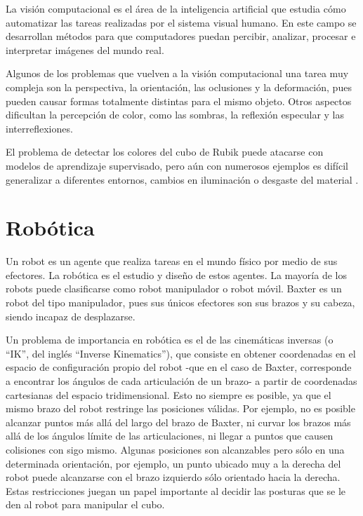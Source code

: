 La visión computacional es el área de la inteligencia artificial que estudia cómo automatizar las tareas realizadas por el sistema visual humano. En este campo se desarrollan métodos para que computadores puedan percibir, analizar, procesar e interpretar imágenes del mundo real\cite{vision}.

Algunos de los problemas que vuelven a la visión computacional una tarea muy compleja son la perspectiva, la orientación, las oclusiones y la deformación, pues pueden causar formas totalmente distintas para el mismo objeto. Otros aspectos dificultan la percepción de color, como las sombras, la reflexión especular y las interreflexiones\cite{aima}.

El problema de detectar los colores del cubo de Rubik puede atacarse con modelos de aprendizaje supervisado, pero aún con numerosos ejemplos es difícil generalizar a diferentes entornos, cambios en iluminación o desgaste del material \cite{rubikcolors}.

\section*{Robótica}
Un robot es un agente que realiza tareas en el mundo físico por medio de sus efectores\cite{aima}. La robótica es el estudio y diseño de estos agentes. La mayoría de los robots puede clasificarse como robot manipulador o robot móvil. Baxter es un robot del tipo manipulador, pues sus únicos efectores son sus brazos y su cabeza, siendo incapaz de desplazarse.

Un problema de importancia en robótica es el de las cinemáticas inversas\cite{ik} (o ``IK'', del inglés ``Inverse Kinematics''), que consiste en obtener coordenadas en el espacio de configuración propio del robot -que en el caso de Baxter, corresponde a encontrar los ángulos de cada articulación de un brazo- a partir de coordenadas cartesianas del espacio tridimensional. Esto no siempre es posible, ya que el mismo brazo del robot restringe las posiciones válidas. Por ejemplo, no es posible alcanzar puntos más allá del largo del brazo de Baxter, ni curvar los brazos más allá de los ángulos límite de las articulaciones, ni llegar a puntos que causen colisiones con sigo mismo. Algunas posiciones son alcanzables pero sólo en una determinada orientación, por ejemplo, un punto ubicado muy a la derecha del robot puede alcanzarse con el brazo izquierdo sólo orientado hacia la derecha. Estas restricciones juegan un papel importante al decidir las posturas que se le den al robot para manipular el cubo.


